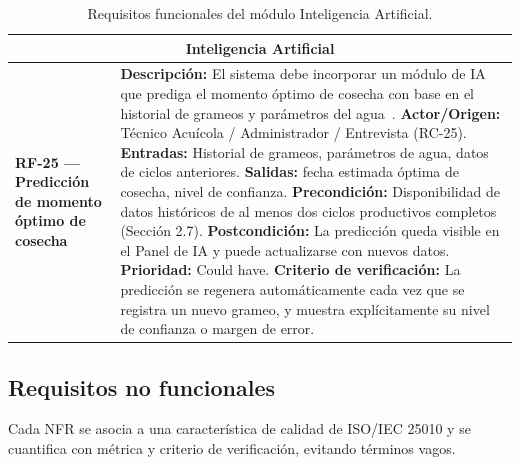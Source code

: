 \documentclass[11pt,a4paper]{article}
\begin{document}
\begin{longtable}{|p{3.5cm}|p{12cm}|}
\caption{Requisitos funcionales del módulo Inteligencia Artificial.}
\label{tab:rf-ia} \\
\hline

\multicolumn{2}{|c|}{\textbf{Inteligencia Artificial}} \\ \hline

\textbf{RF-25 — Predicción de momento óptimo de cosecha} &
\textbf{Descripción:} El sistema debe incorporar un módulo de IA que prediga el momento óptimo de cosecha con base en el historial de grameos y parámetros del agua~\cite{ai_aquaculture_2023,aquaculture_management_2023}. \newline
\textbf{Actor/Origen:} Técnico Acuícola / Administrador / Entrevista (RC-25). \newline
\textbf{Entradas:} Historial de grameos, parámetros de agua, datos de ciclos anteriores. \newline
\textbf{Salidas:} fecha estimada óptima de cosecha, nivel de confianza. \newline
\textbf{Precondición:} Disponibilidad de datos históricos de al menos dos ciclos productivos completos (Sección 2.7). \newline
\textbf{Postcondición:} La predicción queda visible en el Panel de IA y puede actualizarse con nuevos datos. \newline
\textbf{Prioridad:} Could have. \newline
\textbf{Criterio de verificación:} La predicción se regenera automáticamente cada vez que se registra un nuevo grameo, y muestra explícitamente su nivel de confianza o margen de error. \\ \hline

\end{longtable}

\subsection{Requisitos no funcionales}

Cada NFR se asocia a una característica de calidad de ISO/IEC 25010 y se cuantifica con métrica y criterio de verificación, evitando términos vagos.
\end{document}
